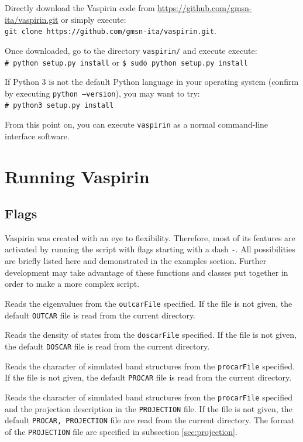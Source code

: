 \documentclass{refart}
\begin{document}
 Directly download the Vaspirin code from \url{https://github.com/gmsn-ita/vaspirin.git} or simply execute:\\
 \texttt{git clone https://github.com/gmsn-ita/vaspirin.git}.
 
Once downloaded, go to the directory \texttt{vaspirin/} and execute execute:\\
\texttt{\# python setup.py install} or \texttt{\$ sudo python setup.py install}

If Python 3 is not the default Python language in your operating system (confirm by executing \texttt{python --version}), you may want to try:\\
\texttt{\# python3 setup.py install}

From this point on, you can execute \texttt{vaspirin} as a normal command-line interface software.

\section{Running Vaspirin}

\subsection{Flags}

 Vaspirin was created with an eye to flexibility. Therefore, most of its features are activated by running  the script with flags starting with a dash \texttt{-}. All possibilities are briefly listed here and demonstrated in the examples section. Further development may take advantage of these functions and classes put together in order to make a more complex script.

 Reads the eigenvalues from the \texttt{outcarFile} specified. If the file is not given, the default \texttt{OUTCAR} file is read from the current directory.

 Reads the density of states from the \texttt{doscarFile} specified. If the file is not given, the default \texttt{DOSCAR} file is read from the current directory.

 Reads the character of simulated band structures from the \texttt{procarFile} specified. If the file is not given, the default \texttt{PROCAR} file is read from the current directory.

 Reads the character of simulated band structures from the \texttt{procarFile} specified and the projection description in the \texttt{PROJECTION} file. If the file is not given, the default \texttt{PROCAR, PROJECTION} file are read from the current directory. The format of the \texttt{PROJECTION} file are specified in subsection \ref{sec:projection}.
\end{document}
